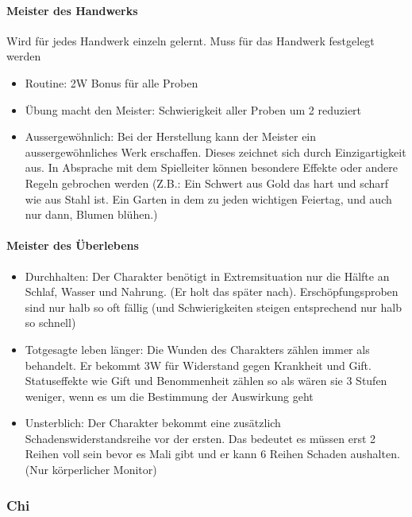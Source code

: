 \documentclass{article}
\begin{document}
\paragraph{Meister des Handwerks}

Wird für jedes Handwerk einzeln gelernt. Muss für das Handwerk festgelegt werden

\begin{itemize}
\item Routine: 2W Bonus für alle Proben
\item Übung macht den Meister: Schwierigkeit aller Proben um 2 reduziert
\item Aussergewöhnlich: Bei der Herstellung kann der Meister ein aussergewöhnliches Werk erschaffen. Dieses zeichnet sich durch Einzigartigkeit aus. In Absprache mit dem Spielleiter können besondere Effekte oder andere Regeln gebrochen werden (Z.B.: Ein Schwert aus Gold das hart und scharf wie aus Stahl ist. Ein Garten in dem zu jeden wichtigen Feiertag, und auch nur dann, Blumen blühen.)
\end{itemize}

\paragraph{Meister des Überlebens}

\begin{itemize}
\item Durchhalten: Der Charakter benötigt in Extremsituation nur die Hälfte an Schlaf, Wasser und Nahrung. (Er holt das später nach). Erschöpfungsproben sind nur halb so oft fällig (und Schwierigkeiten steigen entsprechend nur halb so schnell)
\item Totgesagte leben länger: Die Wunden des Charakters zählen immer als behandelt. Er bekommt 3W für Widerstand gegen Krankheit und Gift. Statuseffekte wie Gift und Benommenheit zählen so als wären sie 3 Stufen weniger, wenn es um die Bestimmung der Auswirkung geht
\item Unsterblich: Der Charakter bekommt eine zusätzlich Schadenswiderstandsreihe vor der ersten. Das bedeutet es müssen erst 2 Reihen voll sein bevor es Mali gibt und er kann 6 Reihen Schaden aushalten. (Nur körperlicher Monitor)
\end{itemize}

\subsubsection{Chi}
\end{document}
